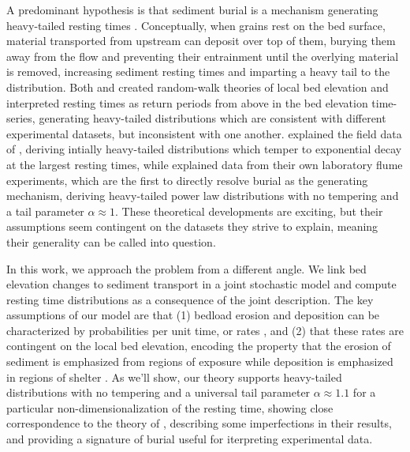 \documentclass[draft]{agujournal2018}
\begin{document}
A predominant hypothesis is that sediment burial is a mechanism generating heavy-tailed resting times \citep{Voepel2013,Martin2014}.
Conceptually, when grains rest on the bed surface, material transported from upstream can deposit over top of them, burying them away from the flow and preventing their entrainment until the overlying material is removed, increasing sediment resting times and imparting a heavy tail to the distribution.
Both \citet{Voepel2013} and \citet{Martin2014} created random-walk theories of local bed elevation and interpreted resting times as return periods from above in the bed elevation time-series, generating heavy-tailed distributions which are consistent with different experimental datasets, but inconsistent with one another.
\citet{Voepel2013} explained the field data of \citet{Habersack2001}, deriving intially heavy-tailed distributions which temper to exponential decay at the largest resting times, while \citet{Martin2014} explained data from their own laboratory flume experiments, which are the first to directly resolve burial as the generating mechanism, deriving heavy-tailed power law distributions with no tempering and a tail parameter $\alpha \approx 1$.
These theoretical developments are exciting, but their assumptions seem contingent on the datasets they strive to explain, meaning their generality can be called into question.

In this work, we approach the problem from a different angle.
We link bed elevation changes to sediment transport in a joint stochastic model and compute resting time distributions as a consequence of the joint description.
The key assumptions of our model are that (1) bedload erosion and deposition can be characterized by probabilities per unit time, or rates \citep[e.g.][]{Einstein1950, Ancey2008}, and (2) that these rates are contingent on the local bed elevation, encoding the property that the erosion of sediment is emphasized from regions of exposure while deposition is emphasized in regions of shelter \citep[e.g.][]{Sawai1987, Wong2007}.
As we'll show, our theory supports heavy-tailed distributions with no tempering and a universal tail parameter $\alpha \approx 1.1$ for a particular non-dimensionalization of the resting time, showing close correspondence to the theory of \citet{Martin2014}, describing some imperfections in their results, and providing a signature of burial useful for iterpreting experimental data.
\end{document}
